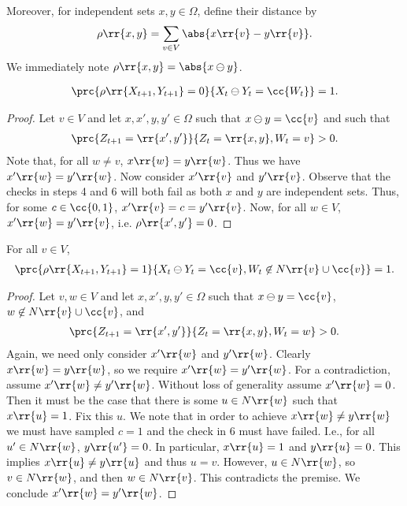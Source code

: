 \documentclass{article}
\begin{document}
Moreover, for independent sets $x,y\in\Omega$, define their distance by
\begin{align*}
  \rho\rr{x,y} = \sum_{v\in V} \abs{x\rr{v}-y\rr{v}}.
\end{align*}
We immediately note $\rho\rr{x,y}=\abs{x\ominus y}$.

\begin{claim*}[3a]
  \begin{align*}
    \prc{\rho\rr{X_{t+1},Y_{t+1}}=0}{X_t\ominus Y_t=\cc{W_t}}=1.
  \end{align*}
  \begin{proof}
    Let $v\in V$ and let $x,x',y,y'\in\Omega$ such that $x\ominus y=\cc{v}$ and such that
    \begin{align*}
      \prc{Z_{t+1}=\rr{x',y'}}{Z_t=\rr{x,y},W_t=v}>0.
    \end{align*}
    Note that, for all $w\neq v$, $x\rr{w}=y\rr{w}$. Thus we have $x'\rr{w}=y'\rr{w}$.
    Now consider $x'\rr{v}$ and $y'\rr{v}$. Observe that the checks in steps 4 and 6 will
    both fail as both $x$ and $y$ are independent sets. Thus, for some $c\in\cc{0,1}$,
    $x'\rr{v}=c=y'\rr{v}$. Now, for all $w\in V$, $x'\rr{w}=y'\rr{v}$, i.e. $\rho\rr{x',y'}=0$.
  \end{proof}
\end{claim*}

\begin{claim*}[3b]
  For all $v\in V$,
  \begin{align*}
    \prc{\rho\rr{X_{t+1},Y_{t+1}}=1}{X_t\ominus Y_t=\cc{v},W_t\not\in N\rr{v}\cup\cc{v}}=1.
  \end{align*}
  \begin{proof}
    Let $v,w\in V$ and let $x,x',y,y'\in\Omega$ such that $x\ominus y=\cc{v}$, $w\not\in N\rr{v}\cup\cc{v}$, and
    \begin{align*}
      \prc{Z_{t+1}=\rr{x',y'}}{Z_t=\rr{x,y},W_t=w}>0.
    \end{align*}
    Again, we need only consider $x'\rr{w}$ and $y'\rr{w}$. Clearly $x\rr{w}=y\rr{w}$, so
    we require $x'\rr{w}=y'\rr{w}$. For a contradiction, assume $x'\rr{w}\neq y'\rr{w}$. Without loss of generality
    assume $x'\rr{w}=0$. Then it must be the case that there is some $u\in N\rr{w}$ such that
    $x\rr{u}=1$. Fix this $u$. We note that in order to achieve $x\rr{w}\neq y\rr{w}$ we must
    have sampled $c=1$ and the check in 6 must have failed. I.e., for all $u'\in N\rr{w}$,
    $y\rr{u'}=0$. In particular, $x\rr{u}=1$ and $y\rr{u}=0$. This implies $x\rr{u}\neq y\rr{u}$
    and thus $u=v$. However, $u\in N\rr{w}$, so $v\in N\rr{w}$, and then $w\in N\rr{v}$.
    This contradicts the premise. We conclude $x'\rr{w}=y'\rr{w}$.
  \end{proof}
\end{claim*}
\end{document}
